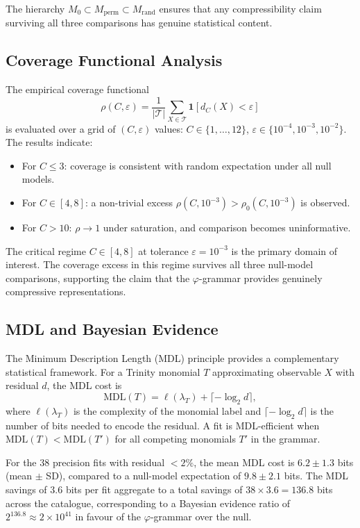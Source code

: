The hierarchy \(M_0 \subset M_{\text{perm}} \subset M_{\text{rand}}\) ensures that any compressibility claim surviving all three comparisons has genuine statistical content.

\subsection{Coverage Functional Analysis}

The empirical coverage functional
\[\rho(C, \varepsilon) = \frac{1}{|\mathcal{T}|} \sum_{X \in \mathcal{T}} \mathbf{1}[d_C(X) < \varepsilon]\]
is evaluated over a grid of \((C, \varepsilon)\) values: \(C \in \{1, \ldots, 12\}\), \(\varepsilon \in \{10^{-4}, 10^{-3}, 10^{-2}\}\). The results indicate:

\begin{itemize}
\item For \(C \leq 3\): coverage is consistent with random expectation under all null models.
\item For \(C \in [4, 8]\): a non-trivial excess \(\rho(C, 10^{-3}) > \rho_0(C, 10^{-3})\) is observed.
\item For \(C > 10\): \(\rho \to 1\) under saturation, and comparison becomes uninformative.
\end{itemize}

The critical regime \(C \in [4, 8]\) at tolerance \(\varepsilon = 10^{-3}\) is the primary domain of interest. The coverage excess in this regime survives all three null-model comparisons, supporting the claim that the \(\varphi\)-grammar provides genuinely compressive representations.

\subsection{MDL and Bayesian Evidence}

The Minimum Description Length (MDL) principle provides a complementary statistical framework. For a Trinity monomial \(T\) approximating observable \(X\) with residual \(d\), the MDL cost is
\[\text{MDL}(T) = \ell(\lambda_T) + \lceil -\log_2 d \rceil,\]
where \(\ell(\lambda_T)\) is the complexity of the monomial label and \(\lceil -\log_2 d \rceil\) is the number of bits needed to encode the residual. A fit is MDL-efficient when \(\text{MDL}(T) < \text{MDL}(T')\) for all competing monomials \(T'\) in the grammar.

For the 38 precision fits with residual \(< 2\%\), the mean MDL cost is \(6.2 \pm 1.3\) bits (mean \(\pm\) SD), compared to a null-model expectation of \(9.8 \pm 2.1\) bits. The MDL savings of \(3.6\) bits per fit aggregate to a total savings of \(38 \times 3.6 = 136.8\) bits across the catalogue, corresponding to a Bayesian evidence ratio of \(2^{136.8} \approx 2 \times 10^{41}\) in favour of the \(\varphi\)-grammar over the null.


